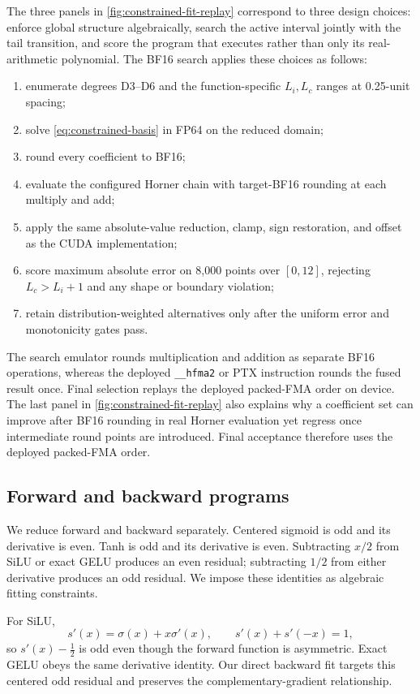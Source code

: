 \documentclass[11pt]{article}
\begin{document}
The three panels in \cref{fig:constrained-fit-replay} correspond to three
design choices: enforce global structure algebraically, search the active
interval jointly with the tail transition, and score the program that executes
rather than only its real-arithmetic polynomial. The BF16 search applies these
choices as follows:
\begin{enumerate}[leftmargin=1.4em]
    \item enumerate degrees D3--D6 and the function-specific $L_i,L_c$ ranges
    at 0.25-unit spacing;
    \item solve \cref{eq:constrained-basis} in FP64 on the reduced domain;
    \item round every coefficient to BF16;
    \item evaluate the configured Horner chain with target-BF16 rounding at
    each multiply and add;
    \item apply the same absolute-value reduction, clamp, sign restoration,
    and offset as the CUDA implementation;
    \item score maximum absolute error on 8,000 points over $[0,12]$, rejecting
    $L_c>L_i+1$ and any shape or boundary violation;
    \item retain distribution-weighted alternatives only after the uniform
    error and monotonicity gates pass.
\end{enumerate}
The search emulator rounds multiplication and addition as separate BF16
operations, whereas the deployed \texttt{\_\_hfma2} or PTX instruction rounds
the fused result once. Final selection replays the deployed packed-FMA order
on device.
The last panel in \cref{fig:constrained-fit-replay} also explains why a
coefficient set can improve after BF16 rounding
in real Horner evaluation yet regress once intermediate round points are
introduced. Final acceptance therefore uses the deployed packed-FMA order.

\subsection{Forward and backward programs}

We reduce forward and backward separately. Centered sigmoid is odd and its
derivative is even. Tanh is odd and its derivative is even. Subtracting $x/2$
from SiLU or exact GELU produces an even residual; subtracting $1/2$ from either
derivative produces an odd residual. We impose these identities as algebraic
fitting constraints.

For SiLU,
\begin{equation}
    s'(x)=\sigma(x)+x\sigma'(x), \qquad
    s'(x)+s'(-x)=1,
    \label{eq:silu-grad-symmetry}
\end{equation}
so $s'(x)-\tfrac12$ is odd even though the forward function is asymmetric.
Exact GELU obeys the same derivative identity. Our direct backward fit targets
this centered odd residual and preserves the complementary-gradient
relationship.
\end{document}
